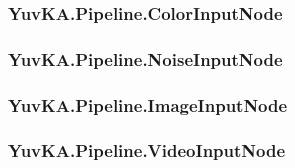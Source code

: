\subsubsection{YuvKA.Pipeline.ColorInputNode}

\subsubsection{YuvKA.Pipeline.NoiseInputNode}

\subsubsection{YuvKA.Pipeline.ImageInputNode}

\subsubsection{YuvKA.Pipeline.VideoInputNode}
